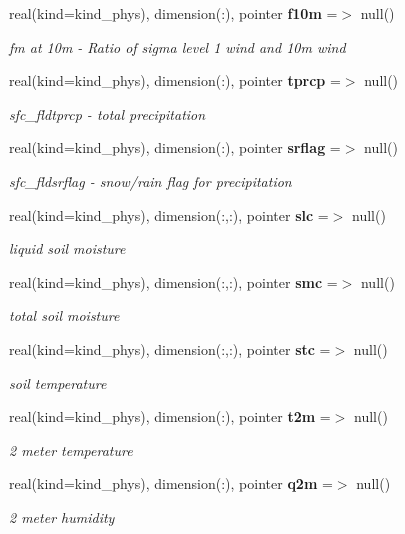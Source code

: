 \begin{DoxyCompactItemize}
real(kind=kind\+\_\+phys), dimension(\+:), pointer \textbf{ f10m} =$>$ null()
\begin{DoxyCompactList}\small\item\em fm at 10m -\/ Ratio of sigma level 1 wind and 10m wind \end{DoxyCompactList}\item 
real(kind=kind\+\_\+phys), dimension(\+:), pointer \textbf{ tprcp} =$>$ null()
\begin{DoxyCompactList}\small\item\em sfc\+\_\+fldtprcp -\/ total precipitation \end{DoxyCompactList}\item 
real(kind=kind\+\_\+phys), dimension(\+:), pointer \textbf{ srflag} =$>$ null()
\begin{DoxyCompactList}\small\item\em sfc\+\_\+fldsrflag -\/ snow/rain flag for precipitation \end{DoxyCompactList}\item 
real(kind=kind\+\_\+phys), dimension(\+:,\+:), pointer \textbf{ slc} =$>$ null()
\begin{DoxyCompactList}\small\item\em liquid soil moisture \end{DoxyCompactList}\item 
real(kind=kind\+\_\+phys), dimension(\+:,\+:), pointer \textbf{ smc} =$>$ null()
\begin{DoxyCompactList}\small\item\em total soil moisture \end{DoxyCompactList}\item 
real(kind=kind\+\_\+phys), dimension(\+:,\+:), pointer \textbf{ stc} =$>$ null()
\begin{DoxyCompactList}\small\item\em soil temperature \end{DoxyCompactList}\item 
real(kind=kind\+\_\+phys), dimension(\+:), pointer \textbf{ t2m} =$>$ null()
\begin{DoxyCompactList}\small\item\em 2 meter temperature \end{DoxyCompactList}\item 
real(kind=kind\+\_\+phys), dimension(\+:), pointer \textbf{ q2m} =$>$ null()
\begin{DoxyCompactList}\small\item\em 2 meter humidity \end{DoxyCompactList}\item 

\end{DoxyCompactItemize}
